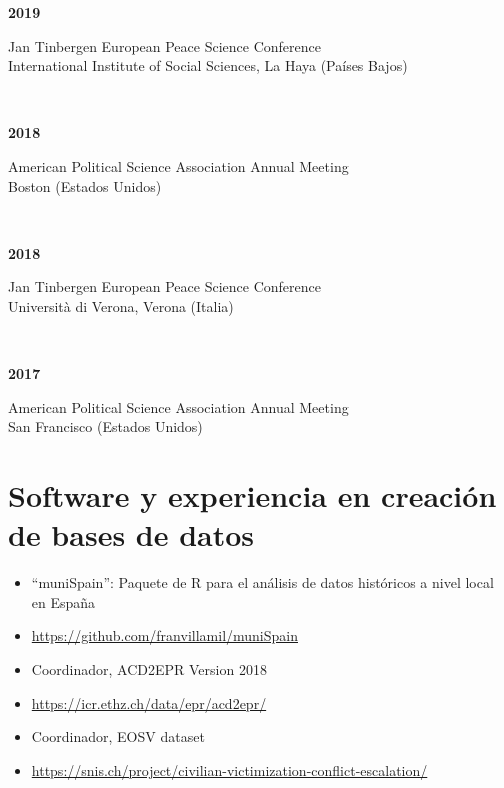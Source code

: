 \documentclass[a4paper, 12pt]{article}
\begin{document}
{\begin{minipage}[t]{0.1\textwidth}
\textbf{2019}
\end{minipage}\hfill\begin{minipage}[t]{0.9\textwidth}
Jan Tinbergen European Peace Science Conference\\
International Institute of Social Sciences, La Haya (Países Bajos)\\
\end{minipage}\\
\begin{minipage}[t]{0.1\textwidth}
\textbf{2018}
\end{minipage}\hfill\begin{minipage}[t]{0.9\textwidth}
American Political Science Association Annual Meeting\\
Boston (Estados Unidos)\\
\end{minipage}\\
\begin{minipage}[t]{0.1\textwidth}
\textbf{2018}
\end{minipage}\hfill\begin{minipage}[t]{0.9\textwidth}
Jan Tinbergen European Peace Science Conference\\
Università di Verona, Verona (Italia)\\
\end{minipage}\\
\begin{minipage}[t]{0.1\textwidth}
\textbf{2017}
\end{minipage}\hfill\begin{minipage}[t]{0.9\textwidth}
American Political Science Association Annual Meeting\\
San Francisco (Estados Unidos)\\
\end{minipage}

\section*{Software y experiencia en creación de bases de datos}

\begin{itemize}[leftmargin=*, nolistsep]
  \item ``muniSpain'': Paquete de R para el análisis de datos históricos a nivel local en España
  \item[] \href{https://github.com/franvillamil/muniSpain}{https://github.com/franvillamil/muniSpain}
	\item Coordinador, ACD2EPR Version 2018
	\item[] \href{https://icr.ethz.ch/data/epr/acd2epr/}{https://icr.ethz.ch/data/epr/acd2epr/}
	\item Coordinador, EOSV dataset
	\item[] \href{https://snis.ch/project/civilian-victimization-conflict-escalation/}{https://snis.ch/project/civilian-victimization-conflict-escalation/}
\end{itemize}

}
\end{document}
